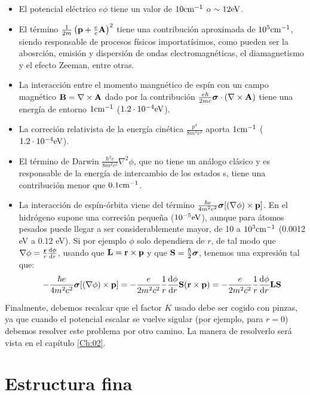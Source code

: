 \begin{itemize}
\item El potencial eléctrico $e\phi$ tiene un valor de $10\text{cm}^{-1}$ o $\sim 12 \text{eV}$.
\item El término $ \frac{1}{2m} \left( \mathbf{p}+\frac{e}{c}\mathbf{A} \right)^2$ tiene una contribución aproximada de $10^5 \text{cm}^{-1}$, siendo responsable de procesos físicos importatísimos, como pueden ser la abosrción, emisión y dispersión de ondas electromagnéticas, el diamagnetismo y el efecto Zeeman, entre otras.
\item La interacción entre el momento mangnético de espín con un campo magnético $\mathbf{B} = \nabla \times \mathbf{A}$ dado por la contribución $\frac{e\hbar}{2mc} \boldsymbol{\sigma} \cdot (\nabla \times \mathbf{A}) $ tiene una energía de entorno $1\text{cm}^{-1}$ ($1.2 \cdot 10^{-4} \text{eV}$). 
\item La correción relativista de la energía cinética $\frac{p^4}{8 m^3 c^2} $ aporta $1\text{cm}^{-1}$ ($1.2 \cdot 10^{-4} \text{eV}$).
\item El término de Darwin $\frac{\hbar^2 e}{8 m^2 c^2} \nabla^2 \phi$, que no tiene un análogo clásico y es responsable de la energía de intercambio de los estados s, tiene una contribución menor que $0.1\text{cm}^{-1}$.
\item La interacción de espín-órbita viene del término $\frac{ \hbar e}{4m^2 c^2} \boldsymbol{\sigma} [(\nabla \phi)\times \mathbf{p}]$. En el hidrógeno supone una correción pequeña ($10^{-5} \text{eV}$), aunque para átomos pesados puede llegar a ser considerablemente mayor, de 10 a $10^3 \text{cm}^{-1}$ (0.0012 eV a 0.12 eV). Si por ejemplo $\phi$ solo dependiera de $r$, de tal modo que $\nabla \phi = \frac{\mathbf{r}}{r} \frac{\mathrm{d} \phi}{\mathrm{d} r}$, usando que $\mathbf{L} = \mathbf{r} \times \mathbf{p}$ y que $\mathbf{S} = \frac{\hbar}{2} \boldsymbol{\sigma}$, tenemos una expresión tal que:
\begin{equation}
    -\frac{ \hbar e}{4m^2 c^2} \boldsymbol{\sigma} [(\nabla \phi)\times \mathbf{p}] = - \frac{e}{2m^2 c^2} \frac{1}{r} \frac{\mathrm{d} \phi}{\mathrm{d} r}  \mathbf{S} (\mathbf{r} \times \mathbf{p}) = - \frac{e}{2m^2 c^2} \frac{1}{r} \frac{\mathrm{d} \phi}{\mathrm{d} r} \mathbf{L} \mathbf{S} \label{Ec:01-03-16}
\end{equation}
\end{itemize}
Finalmente, debemos recalcar que el factor $K$ usado debe ser cogido con pinzas, ya que cuando el potencial escalar se vuelve sigular (por ejemplo, para $r=0$) debemos resolver este problema por otro camino. La manera de resolverlo será vista en el capítulo \ref{Ch:02}.

\section{Estructura fina}

